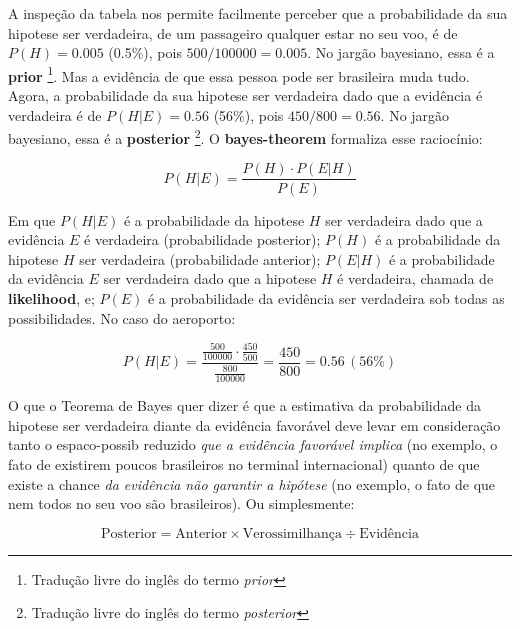 \documentclass[./main.tex]{subfiles}
\begin{document}
A inspeção da tabela nos permite facilmente perceber que a probabilidade da sua \gls{hipotese} ser verdadeira, de um passageiro qualquer estar no seu voo, é de $P(H) = 0.005$ (0.5\%), pois $500 / 100000 = 0.005$. No jargão bayesiano, essa é a \textbf{\gls{prior}} \footnote{Tradução livre do inglês do termo \textit{prior}}. Mas a evidência de que essa pessoa pode ser brasileira muda tudo. Agora, a probabilidade da sua \gls{hipotese} ser verdadeira dado que a evidência é verdadeira é de $P(H | E) = 0.56$ (56\%), pois $450 / 800 = 0.56$. No jargão bayesiano, essa é a \textbf{\gls{posterior}} \footnote{Tradução livre do inglês do termo \textit{posterior}}. O \textbf{\gls{bayes-theorem}} formaliza esse raciocínio:
\begin{linenomath*}
\begin{equation}
\label{eq:bayes}
    P(H | E) = \frac{P(H) \cdot P(E | H)}{P(E)}
\end{equation}
\end{linenomath*}
Em que $P(H | E)$ é a probabilidade da \gls{hipotese} $H$ ser verdadeira dado que a evidência $E$ é verdadeira (probabilidade posterior); $P(H)$ é a probabilidade da \gls{hipotese} $H$ ser verdadeira (probabilidade anterior);  $P(E | H)$ é a probabilidade da evidência $E$ ser verdadeira dado que a \gls{hipotese} $H$ é verdadeira, chamada de \textbf{\gls{likelihood}}, e; $P(E)$ é a probabilidade da evidência ser verdadeira sob todas as possibilidades. No caso do aeroporto:
\begin{linenomath*}
\begin{equation*}
    P(H | E) = \frac{\frac{500}{100000} \cdot \frac{450}{500}}{\frac{800}{100000}} = \frac{450}{800} = 0.56\,(56\%)
\end{equation*}
\end{linenomath*}
O que o Teorema de Bayes quer dizer é que a estimativa da probabilidade da \gls{hipotese} ser verdadeira diante da evidência favorável deve levar em consideração tanto o \gls{espaco-possib} reduzido \textit{que a evidência favorável implica} (no exemplo, o fato de existirem poucos brasileiros no terminal internacional) quanto de que existe a chance \textit{da evidência não garantir a hipótese} (no exemplo, o fato de que nem todos no seu voo são brasileiros).  Ou simplesmente:
\begin{linenomath*}
\begin{equation*}
    \text{Posterior} = \text{Anterior} \times \text{Verossimilhança} \div \text{Evidência}
\end{equation*}
\end{linenomath*}
\end{document}
